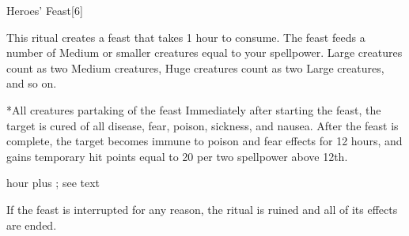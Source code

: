 \begin{spellsection}{Heroes' Feast}[6]
    \begin{spellheader}
    \end{spellheader}
    \begin{spellcontent}
        \begin{spelltargetinginfo}
        \end{spelltargetinginfo}
        \begin{spelleffects}

            \spellline
            \spelleffect This ritual creates a feast that takes 1 hour to consume. The feast feeds a number of Medium or smaller creatures equal to your spellpower. Large creatures count as two Medium creatures, Huge creatures count as two Large creatures, and so on.
            \begin{spelltargets}*{All creatures partaking of the feast}
                Immediately after starting the feast, the target is cured of all disease, fear, poison, sickness, and nausea. After the feast is complete, the target becomes immune to poison and fear effects for 12 hours, and gains temporary hit points equal to 20  per two spellpower above 12th.
            \end{spelltargets}

             hour plus \durext; see text
        \end{spelleffects}
    \end{spellcontent}
    \begin{spellfooter}
        \spellnotes If the feast is interrupted for any reason, the ritual is ruined and all of its effects are ended.
    \end{spellfooter}
\end{spellsection}

